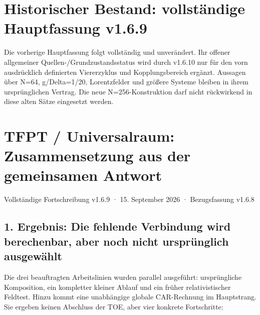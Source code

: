 \section{Historischer Bestand: vollständige Hauptfassung
v1.6.9}\label{historischer-bestand-vollstuxe4ndige-hauptfassung-v1.6.9}

Die vorherige Hauptfassung folgt vollständig und unverändert. Ihr
offener allgemeiner Quellen-/Grundzustandsstatus wird durch v1.6.10 nur
für den vorn ausdrücklich definierten Viererzyklus und Kopplungsbereich
ergänzt. Aussagen über N=64, g/Delta=1/20, Lorentzfelder und größere
Systeme bleiben in ihrem ursprünglichen Vertrag. Die neue
N=256-Konstruktion darf nicht rückwirkend in diese alten Sätze
eingesetzt werden.

\section{TFPT / Universalraum: Zusammensetzung aus der gemeinsamen
Antwort}\label{tfpt-universalraum-zusammensetzung-aus-der-gemeinsamen-antwort}

Vollständige Fortschreibung v1.6.9 · 15. September 2026 · Bezugsfassung
v1.6.8

\subsection{1. Ergebnis: Die fehlende Verbindung wird berechenbar, aber
noch nicht ursprünglich
ausgewählt}\label{ergebnis-die-fehlende-verbindung-wird-berechenbar-aber-noch-nicht-urspruxfcnglich-ausgewuxe4hlt}

Die drei beauftragten Arbeitslinien wurden parallel ausgeführt:
ursprüngliche Komposition, ein kompletter kleiner Ablauf und ein früher
relativistischer Feldtest. Hinzu kommt eine unabhängige globale
CAR-Rechnung im Hauptstrang. Sie ergeben keinen Abschluss der TOE, aber
vier konkrete Fortschritte:

